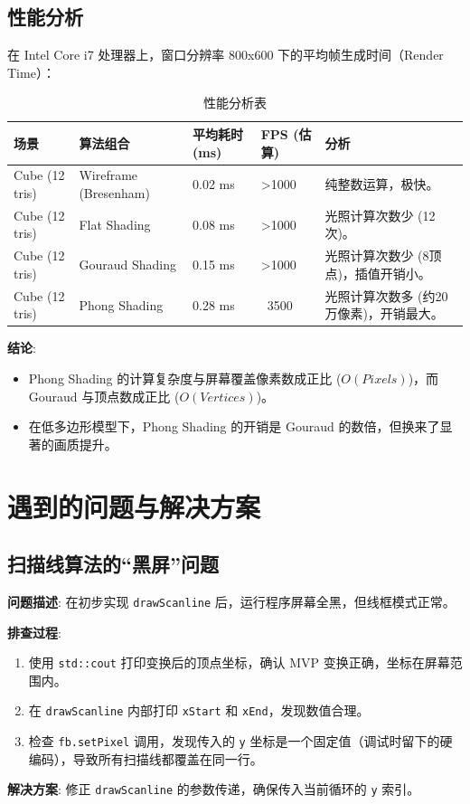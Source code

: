 \documentclass[a4paper]{article}
\begin{document}
\subsection{性能分析}
在 Intel Core i7 处理器上，窗口分辨率 800x600 下的平均帧生成时间（Render Time）：

\begin{table}[H]
\centering
\begin{tabular}{|l|l|l|l|l|}
\hline
场景 & 算法组合 & 平均耗时 (ms) & FPS (估算) & 分析 \\ \hline
Cube (12 tris) & Wireframe (Bresenham) & 0.02 ms & >1000 & 纯整数运算，极快。 \\ \hline
Cube (12 tris) & Flat Shading & 0.08 ms & >1000 & 光照计算次数少 (12次)。 \\ \hline
Cube (12 tris) & Gouraud Shading & 0.15 ms & >1000 & 光照计算次数少 (8顶点)，插值开销小。 \\ \hline
Cube (12 tris) & Phong Shading & 0.28 ms & ~3500 & 光照计算次数多 (约20万像素)，开销最大。 \\ \hline
\end{tabular}
\caption{性能分析表}
\end{table}

\textbf{结论}:
\begin{itemize}
    \item Phong Shading 的计算复杂度与屏幕覆盖像素数成正比 ($O(Pixels)$)，而 Gouraud 与顶点数成正比 ($O(Vertices)$)。
    \item 在低多边形模型下，Phong Shading 的开销是 Gouraud 的数倍，但换来了显著的画质提升。
\end{itemize}

\section{遇到的问题与解决方案}

\subsection{扫描线算法的“黑屏”问题}
\textbf{问题描述}: 在初步实现 \texttt{drawScanline} 后，运行程序屏幕全黑，但线框模式正常。

\textbf{排查过程}:
\begin{enumerate}
    \item 使用 \texttt{std::cout} 打印变换后的顶点坐标，确认 MVP 变换正确，坐标在屏幕范围内。
    \item 在 \texttt{drawScanline} 内部打印 \texttt{xStart} 和 \texttt{xEnd}，发现数值合理。
    \item 检查 \texttt{fb.setPixel} 调用，发现传入的 \texttt{y} 坐标是一个固定值（调试时留下的硬编码），导致所有扫描线都覆盖在同一行。
\end{enumerate}
\textbf{解决方案}: 修正 \texttt{drawScanline} 的参数传递，确保传入当前循环的 \texttt{y} 索引。
\end{document}

